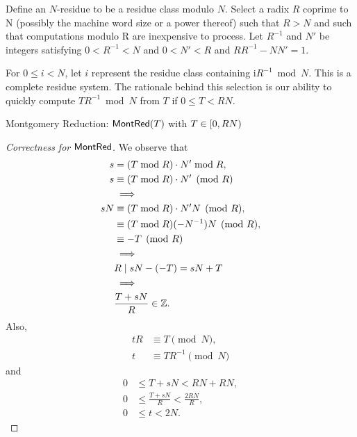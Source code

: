 Define an $N$-residue to be a residue class modulo $N$. Select a radix $R$
coprime to N (possibly the machine word size or a power thereof) such that $R > N$
and such that computations modulo R are inexpensive to process. Let $R^{-1}$ and $N'$ be
integers satisfying $0 < R^{-1} < N$ and $0 < N' < R$ and $RR^{-1} - NN' = 1$.

For $0\leq i < N$, let $i$ represent the residue class containing i$R^{-1}\bmod N$. This is a
complete residue system.  The rationale behind this selection is our ability to quickly
compute $TR^{-1}\bmod N$ from $T$ if $0\leq T < RN$.

\vspace{16pt}
\begin{algorithm}[H]
\DontPrintSemicolon
\caption{Montgomery Reduction: $\mathsf{MontRed}(T)$ with $T\in\intco{0,RN}$}
\BlankLine
{}
\BlankLine
{}
\end{algorithm}

\begin{proof}[Correctness for $\mathsf{MontRed}$]
We observe that
\begin{align*}
	s&=(T\bmod R)\cdot N'\bmod {R}, \\
	s&\equiv(T\bmod {R})\cdot N'\pmod {R}\\
	&\implies\\
	sN&\equiv(T\bmod {R})\cdot N'N\pmod {R}, \\
	&\equiv (T\bmod {R})(-N^{-1})N\pmod {R}, \\
	&\equiv -T\pmod{R}\\
	&\implies\\ 
	&R\mid sN-(-T)=sN+T\\
	&\implies\\ 
	&\frac{T+sN}{R}\in\mathbb{Z}.
\end{align*}
Also, \begin{align*}
tR&\equiv T\pmod{N},\\
t&\equiv TR^{-1}\pmod{N}
\end{align*} and
\begin{align*}
	0&\leq T+sN<RN+RN,\\
	0&\leq \frac{T+sN}{R}<\frac{2RN}{R},\\
	0&\leq t< 2N.
\end{align*}
\end{proof}

